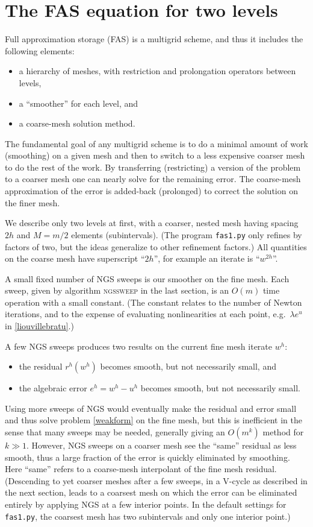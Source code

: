 \documentclass[letterpaper,final,12pt,reqno]{amsart}
\begin{document}
\section{The FAS equation for two levels}  \label{sec:fastwolevel}

Full approximation storage (FAS) \cite{Brandt1977,Briggsetal2000} is a multigrid scheme, and thus it includes the following elements:
\begin{itemize}
\item a hierarchy of meshes, with restriction and prolongation operators between levels,
\item a ``smoother'' for each level, and
\item a coarse-mesh solution method.
\end{itemize}
The fundamental goal of any multigrid scheme is to do a minimal amount of work (smoothing) on a given mesh and then to switch to a less expensive coarser mesh to do the rest of the work.  By transferring (restricting) a version of the problem to a coarser mesh one can nearly solve for the remaining error.  The coarse-mesh approximation of the error is added-back (prolonged) to correct the solution on the finer mesh.

We describe only two levels at first, with a coarser, nested mesh having spacing $2h$ and $M=m/2$ elements (subintervals).  (The program \texttt{fas1.py} only refines by factors of two, but the ideas generalize to other refinement factors.)  All quantities on the coarse mesh have superscript ``$2h$'', for example an iterate is ``$w^{2h}$''.

A small fixed number of NGS sweeps is our smoother on the fine mesh.  Each sweep, given by algorithm \textsc{ngssweep} in the last section, is an $O(m)$ time operation with a small constant.  (The constant relates to the number of Newton iterations, and to the expense of evaluating nonlinearities at each point, e.g.~$\lambda e^u$ in \eqref{liouvillebratu}.)

A few NGS sweeps produces two results on the current fine mesh iterate $w^h$:
\begin{itemize}
\item the residual $r^h(w^h)$ becomes smooth, but not necessarily small, and
\item the algebraic error $e^h = w^h - u^h$ becomes smooth, but not necessarily small.
\end{itemize}

Using more sweeps of NGS would eventually make the residual and error small and thus solve problem \eqref{weakform} on the fine mesh, but this is inefficient in the sense that many sweeps may be needed, generally giving an $O(m^k)$ method for $k\gg 1$.  However, NGS sweeps on a coarser mesh see the ``same'' residual as less smooth, thus a large fraction of the error is quickly eliminated by smoothing.  Here ``same'' refers to a coarse-mesh interpolant of the fine mesh residual.  (Descending to yet coarser meshes after a few sweeps, in a V-cycle as described in the next section, leads to a coarsest mesh on which the error can be eliminated entirely by applying NGS at a few interior points.  In the default settings for \texttt{fas1.py}, the coarsest mesh has two subintervals and only one interior point.)
\end{document}
